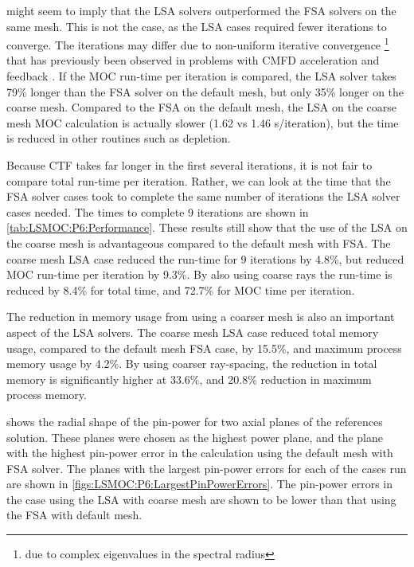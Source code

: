 {{{       might seem to imply that the \ac{LSA} solvers outperformed the \ac{FSA} solvers on the same mesh.
      This is not the case, as the \ac{LSA} cases required fewer iterations to converge.
      The iterations may differ due to non-uniform iterative convergence \footnote{due to complex eigenvalues in the spectral radius} that has previously been observed in problems with \ac{CMFD} acceleration and feedback \cite{Kochunas2017}.
      If the \ac{MOC} run-time per iteration is compared, the \ac{LSA} solver takes 79\% longer than the \ac{FSA} solver on the default mesh, but only 35\% longer on the coarse mesh.
      Compared to the \ac{FSA} on the default mesh, the \ac{LSA} on the coarse mesh \ac{MOC} calculation is actually slower (1.62 vs 1.46 s/iteration), but the time is reduced in other routines such as depletion.

      Because \ac{CTF} takes far longer in the first several iterations, it is not fair to compare total run-time per iteration.
      Rather, we can look at the time that the \ac{FSA} solver cases took to complete the same number of iterations the \ac{LSA} solver cases needed.
      The times to complete 9 iterations are shown in \cref{tab:LSMOC:P6:Performance}.
      These results still show that the use of the \ac{LSA} on the coarse mesh is advantageous compared to the default mesh with \ac{FSA}.
      The coarse mesh \ac{LSA} case reduced the run-time for 9 iterations by 4.8\%, but reduced \ac{MOC} run-time per iteration by 9.3\%.
      By also using coarse rays the run-time is reduced by 8.4\% for total time, and 72.7\% for \ac{MOC} time per iteration.

      The reduction in memory usage from using a coarser mesh is also an important aspect of the \ac{LSA} solvers.
      The coarse mesh \ac{LSA} case reduced total memory usage, compared to the default mesh \ac{FSA} case, by 15.5\%, and maximum process memory usage by 4.2\%.
      By using coarser ray-spacing, the reduction in total memory is significantly higher at 33.6\%, and 20.8\% reduction in maximum process memory.

       shows the radial shape of the pin-power for two axial planes of the references solution.
      These planes were chosen as the highest power plane, and the plane with the highest pin-power error in the calculation using the default mesh with \ac{FSA} solver.
      The planes with the largest pin-power errors for each of the cases run are shown in \cref{figs:LSMOC:P6:LargestPinPowerErrors}.
      The pin-power errors in the case using the \ac{LSA} with coarse mesh are shown to be lower than that using the \ac{FSA} with default mesh.

}}}

